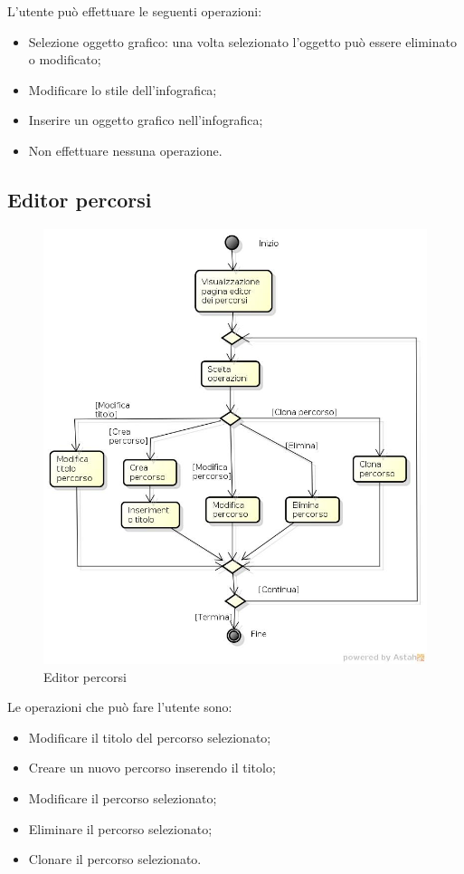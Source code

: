L'utente può effettuare le seguenti operazioni:
\begin{itemize}
\item Selezione oggetto grafico: una volta selezionato l'oggetto può essere eliminato o modificato;
\item Modificare lo stile dell'infografica;
\item Inserire un oggetto grafico nell'infografica;
\item Non effettuare nessuna operazione.
\end{itemize}

\subsection{Editor percorsi}

\begin{figure}[h!]
		\centering
		\includegraphics[scale=.2]{img/Editor_percorsi.jpg}
		\caption{Editor percorsi}
		\label{fig:ModelloSpy}
\end{figure}

Le operazioni che può fare l'utente sono:
\begin{itemize}
\item Modificare il titolo del percorso selezionato;
\item Creare un nuovo percorso inserendo il titolo;
\item Modificare il percorso selezionato;
\item Eliminare il percorso selezionato; 
\item Clonare il percorso selezionato.
\end{itemize}

